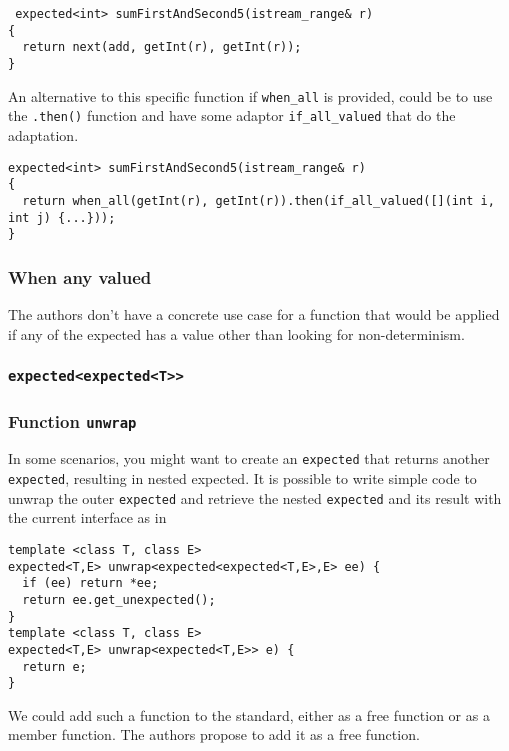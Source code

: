 \documentclass[a4paper,10pt]{article}
\newcommand{\cpp}[1]{\lstinline{#1}}
\begin{document}
\begin{lstlisting}
 expected<int> sumFirstAndSecond5(istream_range& r)
{
  return next(add, getInt(r), getInt(r));
}
\end{lstlisting}

An alternative to this specific function if \cpp{when_all} is provided, could be to use the \cpp{.then()} function and have some adaptor \cpp{if_all_valued} that do the adaptation.

\begin{lstlisting}
expected<int> sumFirstAndSecond5(istream_range& r)
{
  return when_all(getInt(r), getInt(r)).then(if_all_valued([](int i, int j) {...}));
}
\end{lstlisting}

\subsubsection{When any valued}

The authors don't have a concrete use case for a function that would be applied if any of the expected has a value other than looking for non-determinism.

\subsubsection{\cpp{expected<expected<T>>}}


\subsubsection{Function \cpp{unwrap}}

In some scenarios, you might want to create an \cpp{expected} that returns another \cpp{expected}, resulting in nested expected. 
It is possible to write simple code to unwrap the outer \cpp{expected} and retrieve the nested \cpp{expected} and its result with the current interface as in

\begin{lstlisting}
template <class T, class E>
expected<T,E> unwrap<expected<expected<T,E>,E> ee) {
  if (ee) return *ee;
  return ee.get_unexpected();
}
template <class T, class E>
expected<T,E> unwrap<expected<T,E>> e) {
  return e;
}
\end{lstlisting}

We could add such a function to the standard, either as a free function or as a member function. The authors propose to add it as a free function.
\end{document}
